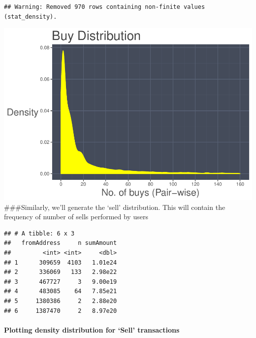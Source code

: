\documentclass[]{article}
\newenvironment{Shaded}{\begin{snugshade}}{\end{snugshade}}
\newcommand{\KeywordTok}[1]{\textcolor[rgb]{0.13,0.29,0.53}{\textbf{#1}}}
\newcommand{\DataTypeTok}[1]{\textcolor[rgb]{0.13,0.29,0.53}{#1}}
\newcommand{\StringTok}[1]{\textcolor[rgb]{0.31,0.60,0.02}{#1}}
\newcommand{\OperatorTok}[1]{\textcolor[rgb]{0.81,0.36,0.00}{\textbf{#1}}}
\newcommand{\NormalTok}[1]{#1}
\let\oldparagraph\paragraph
\renewcommand{\paragraph}[1]{\oldparagraph{#1}\mbox{}}
\begin{document}
\begin{verbatim}
## Warning: Removed 970 rows containing non-finite values (stat_density).
\end{verbatim}

\includegraphics{analysis_files/figure-latex/unnamed-chunk-29-1.pdf}
\#\#\#Similarly, we'll generate the `sell' distribution. This will
contain the frequency of number of sells performed by users

\begin{Shaded}
\end{Shaded}

\begin{verbatim}
## # A tibble: 6 x 3
##   fromAddress     n sumAmount
##         <int> <int>     <dbl>
## 1      309659  4103   1.01e24
## 2      336069   133   2.98e22
## 3      467727     3   9.00e19
## 4      483085    64   7.85e21
## 5     1380386     2   2.88e20
## 6     1387470     2   8.97e20
\end{verbatim}

\paragraph{\texorpdfstring{Plotting density distribution for `Sell'
transactions}{Plotting density distribution for Sell transactions}}\label{plotting-density-distribution-for-sell-transactions-1}
\end{document}
